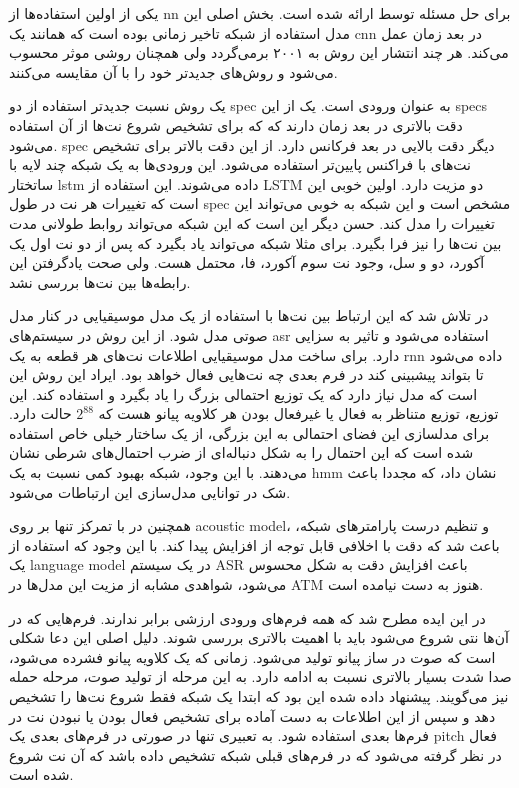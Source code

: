 یکی از اولین استفاده‌ها از \gls{nn} برای حل مسئله توسط
\cite{marolt2004connectionist} ارائه شده است. بخش اصلی این مدل استفاده از شبکه
تاخیر زمانی بوده است که همانند یک \gls{cnn} در بعد زمان عمل می‌کند. هر چند
انتشار این روش به ۲۰۰۱ برمی‌گردد ولی همچنان روشی موثر محسوب می‌شود و روش‌های
جدیدتر خود را با آن مقایسه می‌کنند.

یک روش نسبت جدیدتر \cite{bock2012polyphonic} استفاده از دو \gls{spec} به عنوان
ورودی است. یک از این \glspl{spec} دقت بالاتری در بعد زمان دارند که که برای تشخیص
شروع نت‌ها از آن استفاده می‌شود. \gls{spec} دیگر دقت بالایی در بعد فرکانس دارد.
از این دقت بالاتر برای تشخیص نت‌های با فراکنس پایین‌تر استفاده می‌شود. این
ورودی‌ها به یک شبکه چند لایه با ساتختار \gls{lstm} داده می‌شوند. این استفاده از
\gls{LSTM} دو مزیت دارد. اولین خوبی این است که تغییرات هر نت در طول \gls{spec}
مشخص است و این شبکه به خوبی می‌تواند این تغییرات را مدل کند. حسن دیگر این است که
این شبکه می‌تواند روابط طولانی مدت بین نت‌ها را نیز فرا بگیرد. برای مثلا شبکه
می‌تواند یاد بگیرد که پس از دو نت اول یک آکورد، دو و سل، وجود نت سوم آکورد، فا،
محتمل هست. ولی صحت یادگرفتن این رابطه‌ها بین نت‌ها بررسی نشد.

در \cite{sigtia2016end} تلاش شد که این ارتباط بین نت‌ها با استفاده از یک مدل
موسیقیایی در کنار مدل صوتی مدل شود. از این روش در سیستم‌های \gls{asr} استفاده
می‌شود و تاثیر به سزایی دارد. برای ساخت مدل موسیقیایی اطلاعات نت‌های هر قطعه به
یک \gls{rnn} داده می‌شود تا بتواند پیشبینی کند در فرم بعدی چه نت‌هایی فعال خواهد
بود. ایراد این روش این است که مدل نیاز دارد که یک توزیع احتمالی بزرگ را یاد
بگیرد و استفاده کند. این توزیع، توزیع متناظر به فعال یا غیرفعال بودن هر کلاویه
پیانو هست که $2^{88}$ حالت دارد. برای مدلسازی این فضای احتمالی به این بزرگی، از
یک ساختار خیلی خاص استفاده شده است که این احتمال را به شکل دنباله‌ای از ضرب
احتمال‌های شرطی نشان می‌دهند. با این وجود، شبکه بهبود کمی نسبت به یک \gls{hmm}
نشان داد، که مجددا باعث شک در توانایی مدل‌سازی این ارتباطات می‌شود.

همچنین در \cite{kelz2016potential} با تمرکز تنها بر روی \gls{acoustic model}، و
تنظیم درست پارامترهای شبکه، باعث شد که دقت با اخلافی قابل توجه از افزایش پیدا
کند. با این وجود که استفاده از یک \gls{language model} در یک سیستم \gls{ASR}
باعث افزایش دقت به شکل محسوس می‌شود، شواهدی مشابه از مزیت این مدل‌ها در
\gls{ATM} هنوز به دست نیامده است.

در \cite{hawthorne2017onsets} این ایده مطرح شد که همه فرم‌‌های ورودی ارزشی برابر
ندارند. فرم‌هایی که در آن‌ها نتی شروع می‌شود باید با اهمیت بالاتری بررسی شوند.
دلیل اصلی این دعا شکلی است که صوت در ساز پیانو تولید می‌شود. زمانی که یک کلاویه
پیانو فشرده می‌شود، صدا شدت بسیار بالاتری نسبت به ادامه دارد. به این مرحله از
تولید صوت، مرحله حمله نیز می‌گویند. پیشنهاد داده شده این بود که ابتدا یک شبکه
فقط شروع نت‌ها را تشخیص دهد و سپس از این اطلاعات به دست آماده برای تشخیص فعال
بودن یا نبودن نت‌ در فرم‌ها بعدی استفاده شود. به تعبیری تنها در صورتی در فرم‌های
بعدی یک \gls{pitch} فعال در نظر گرفته می‌شود که در فرم‌های قبلی شبکه تشخیص داده
باشد که آن نت شروع شده است.

